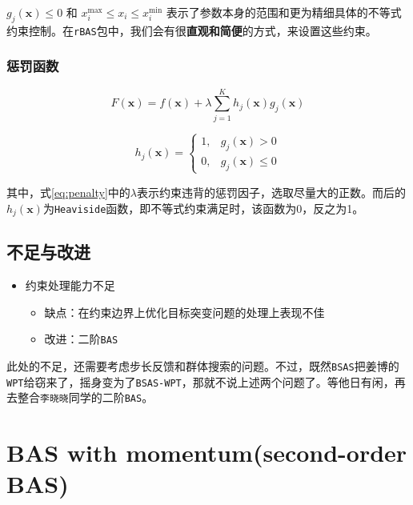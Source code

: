 \documentclass[]{ctexbook}
\providecommand{\tightlist}{%
  \setlength{\itemsep}{0pt}\setlength{\parskip}{0pt}}
\begin{document}
\(g_j(\mathbf{x})\leq 0\) 和
\(x^\text{max}_i \leq x_i \leq x^\text{min}_i\)
表示了参数本身的范围和更为精细具体的不等式约束控制。在\texttt{rBAS}包中，我们会有很\textbf{直观和简便}的方式，来设置这些约束。

\subsubsection{惩罚函数}

\begin{equation}
F(\mathbf{x})=f(\mathbf{x})+\lambda\sum_{j=1}^{K}h_j(\mathbf{x})g_j(\mathbf{x})
\label{eq:penalty}
\end{equation}

\begin{equation}
h_j(\mathbf{x}) = \begin{cases} 
1, & g_j(\mathbf{x})>0 \\ 
0, & g_j(\mathbf{x})\leq0
\end{cases}
\label{eq:violation}
\end{equation}

其中，式\eqref{eq:penalty}中的\(\lambda\)表示约束违背的惩罚因子，选取尽量大的正数。而后的\(h_j(\mathbf{x})\)为\texttt{Heaviside}函数，即不等式约束满足时，该函数为0，反之为1。

\subsection{不足与改进}\label{BSASimprove2}

\begin{itemize}
\tightlist
\item
  约束处理能力不足

  \begin{itemize}
  \tightlist
  \item
    缺点：在约束边界上优化目标突变问题的处理上表现不佳
  \item
    改进：二阶\texttt{BAS}
  \end{itemize}
\end{itemize}

此处的不足，还需要考虑步长反馈和群体搜索的问题。不过，既然\texttt{BSAS}把姜博的\texttt{WPT}给窃来了，摇身变为了\texttt{BSAS-WPT}，那就不说上述两个问题了。等他日有闲，再去整合\texttt{李晓晓}同学的二阶\texttt{BAS}。

\section{BAS with momentum(second-order BAS)}\label{BAS2}
\end{document}
